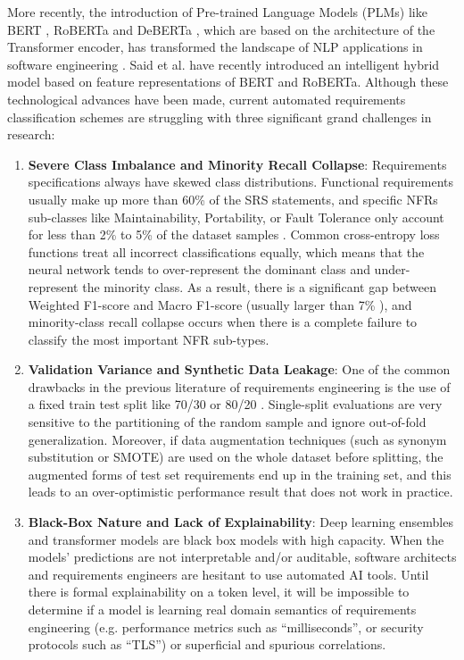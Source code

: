 \documentclass[11pt,a4paper]{article}
\begin{document}
More recently, the introduction of Pre-trained Language Models (PLMs) like BERT \cite{devlin2019bert}, RoBERTa \cite{liu2019roberta} and DeBERTa \cite{he2021deberta}, which are based on the architecture of the Transformer encoder, has transformed the landscape of NLP applications in software engineering \cite{hey2020norbert}. Said et al. \cite{said2026intelligent} have recently introduced an intelligent hybrid model based on feature representations of BERT and RoBERTa. Although these technological advances have been made, current automated requirements classification schemes are struggling with three significant grand challenges in research:

\begin{enumerate}
    \item \textbf{Severe Class Imbalance and Minority Recall Collapse}: Requirements specifications always have skewed class distributions. Functional requirements usually make up more than 60\% of the SRS statements, and specific NFRs sub-classes like Maintainability, Portability, or Fault Tolerance only account for less than 2\% to 5\% of the dataset samples \cite{cui2019class}. Common cross-entropy loss functions treat all incorrect classifications equally, which means that the neural network tends to over-represent the dominant class and under-represent the minority class. As a result, there is a significant gap between Weighted F1-score and Macro F1-score (usually larger than 7\% \cite{lin2017focal}), and minority-class recall collapse occurs when there is a complete failure to classify the most important NFR sub-types.
    \item \textbf{Validation Variance and Synthetic Data Leakage}: One of the common drawbacks in the previous literature of requirements engineering is the use of a fixed train test split like 70/30 or 80/20 \cite{said2026intelligent}. Single-split evaluations are very sensitive to the partitioning of the random sample and ignore out-of-fold generalization. Moreover, if data augmentation techniques (such as synonym substitution or SMOTE) are used on the whole dataset before splitting, the augmented forms of test set requirements end up in the training set, and this leads to an over-optimistic performance result that does not work in practice.
    \item \textbf{Black-Box Nature and Lack of Explainability}: Deep learning ensembles and transformer models are black box models with high capacity. When the models' predictions are not interpretable and/or auditable, software architects and requirements engineers are hesitant to use automated AI tools. Until there is formal explainability on a token level, it will be impossible to determine if a model is learning real domain semantics of requirements engineering (e.g. performance metrics such as ``milliseconds'', or security protocols such as ``TLS'') or superficial and spurious correlations.
\end{enumerate}
\end{document}
